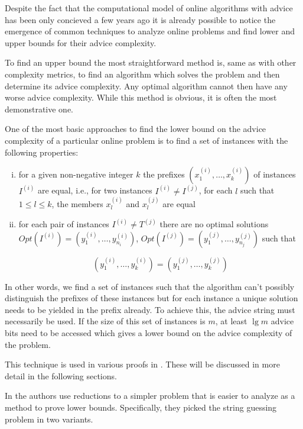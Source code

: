 Despite the fact that the computational model of online algorithms with
advice has been only concieved a few years ago it is already possible to
notice the emergence of common techniques to analyze online problems and
find lower and upper bounds for their advice complexity.

To find an upper bound the most straightforward method is, same as with
other complexity metrics, to find an algorithm which solves the problem
and then determine its advice complexity. Any optimal algorithm cannot
then have any worse advice complexity. While this method is obvious, it is
often the most demonstrative one.

One of the most basic approaches to find the lower bound on the advice
complexity of a particular online problem is to find a set of instances
with the following properties:

\begin{enumerate}[(i)]
    \item
    for a given non-negative integer $k$ the prefixes $(x_1^{(i)}, \dots,
    x_k^{(i)})$ of instances $I^{(i)}$ are equal, i.e., for two instances
    $I^{(i)} \not= I^{(j)}$, for each $l$ such that $1 \leq l \leq k$,
    the members $x_l^{(i)}$ and $x_l^{(j)}$ are equal

    \item
    for each pair of instances $I^{(i)} \not= T^{(j)}$ there are no
    optimal solutions $Opt(I^{(i)}) = (y_1^{(i)}, \dots, y_{n_i}^{(i)})$,
    $Opt(I^{(j)}) = (y_1^{(j)}, \dots, y_{n_j}^{(j)})$ such that

    $$(y_1^{(i)}, \dots, y_{k}^{(i)}) = (y_1^{(j)}, \dots, y_{k}^{(j)})$$
\end{enumerate}

In other words, we find a set of instances such that the algorithm can't
possibly distinguish the prefixes of these instances but for each instance
a unique solution needs to be yielded in the prefix already. To achieve
this, the advice string must necessarily be used. If the size of this set
of instances is $m$, at least $\lg m$ advice bits need to be accessed
which gives a lower bound on the advice complexity of the problem.

This technique is used in various proofs in \cite{misof-trivial-graphs}.
These will be discussed in more detail in the following sections.

In \cite{string-guessing} the authors use reductions to a simpler problem
that is easier to analyze as a method to prove lower bounds. Specifically,
they picked the string guessing problem in two variants.

